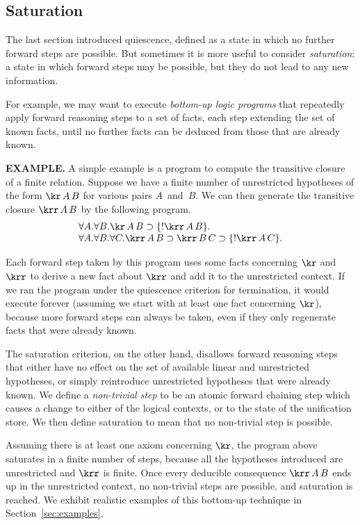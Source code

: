\documentclass{sig-alt}
\begin{document}
\subsection{Saturation}
\label{ssec:saturation}
The last section introduced quiescence, defined as a state in which
no further forward steps are possible.  But sometimes it is more useful
to consider \emph{saturation}: a state in which forward steps may be
possible, but they do not lead to any new information.

%
For example, we may want to execute \emph{bottom-up logic programs}
that repeatedly apply forward reasoning steps to a set of facts,
each step extending the set of known facts, until no further facts
can be deduced from those that are already known.

{\bf EXAMPLE.}\enspace
A simple example is a program to compute the
transitive closure of a finite relation. Suppose we have a finite
number of unrestricted hypotheses of the form $\kr\,A\,B$ for various
pairs $A$~and~$B$.  We can then generate the transitive closure
$\krr\,A\,B$ by the following program.
$$
\begin{array}{l}
  \forall A.\forall B.\kr\,A\,B \iimp \{!\krr\,A\,B\}. \\
  \forall A.\forall B.\forall C.
    \krr\,A\,B \iimp \krr\,B\,C \iimp \{!\krr\,A\,C\}. \\
\end{array}
$$

Each forward step taken by this program uses some facts concerning
$\kr$ and $\krr$ to derive a new fact about $\krr$ and add it to the
unrestricted context.  If we ran the program under the quiescence
criterion for termination, it would execute forever (assuming we
start with at least one fact concerning $\kr$), because more forward
steps can always be taken, even if they only regenerate facts that
were already known.

The saturation criterion, on the other hand, disallows forward
reasoning steps that either have no effect on the set of available
linear and unrestricted hypotheses, or simply reintroduce unrestricted
hypotheses that were already known.  We define a \emph{non-trivial
  step} to be an atomic forward chaining step which causes a change to
either of the logical contexts, or to the state of the unification
store.  We then define saturation to mean that no non-trivial step is
possible.

Assuming there is at least one axiom concerning $\kr$, the program above
saturates in a finite number of steps, because all the hypotheses
introduced are unrestricted and $\krr$ is finite.  Once every
deducible consequence $\krr\,A\,B$ ends up in the unrestricted context,
no non-trivial steps are possible, and saturation is reached.  We exhibit
realistic examples of this bottom-up technique in
Section~\ref{sec:examples}.
\end{document}

